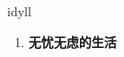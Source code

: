 
\begin{frame}
{\huge idyll}
\begin{center}
\begin{enumerate}\Large
  \item \textbf{无忧无虑的生活}
\end{enumerate}
\end{center}
\end{frame}
